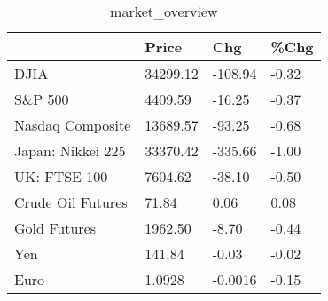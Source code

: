 \documentclass{article}%
\begin{document}
%


\begin{table}[htbp]%
\caption{market\_overview}%
\centering%
\begin{adjustbox}{width=1\textwidth}%
\begin{tabular}{llll}
\toprule
                  &    Price &     Chg &  \%Chg \\
\midrule
             DJIA & 34299.12 & -108.94 & -0.32 \\
          S\&P 500 &  4409.59 &  -16.25 & -0.37 \\
 Nasdaq Composite & 13689.57 &  -93.25 & -0.68 \\
Japan: Nikkei 225 & 33370.42 & -335.66 & -1.00 \\
     UK: FTSE 100 &  7604.62 &  -38.10 & -0.50 \\
Crude Oil Futures &    71.84 &    0.06 &  0.08 \\
     Gold Futures &  1962.50 &   -8.70 & -0.44 \\
              Yen &   141.84 &   -0.03 & -0.02 \\
             Euro &   1.0928 & -0.0016 & -0.15 \\
\bottomrule
\end{tabular}
%
\end{adjustbox}%
\end{table}

%
\end{document}
